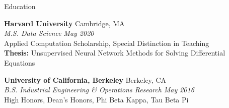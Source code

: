 \documentclass{resume} %
\begin{document}

\begin{rSection}{Education}

{\bf Harvard University} \hfill { Cambridge, MA}
	\\ {\em M.S. Data Science} \hfill {\em May 2020}
	\\ Applied Computation Scholarship, Special Distinction in Teaching
	\\ {\bf Thesis:} Unsupervised Neural Network Methods for Solving Differential Equations

{\bf University of California, Berkeley} \hfill {Berkeley, CA}
	\\ {\em B.S. Industrial Engineering \& Operations Research} \hfill {\em May 2016}
	\\ High Honors, Dean's Honors, Phi Beta Kappa, Tau Beta Pi

\end{rSection}

\end{document}
